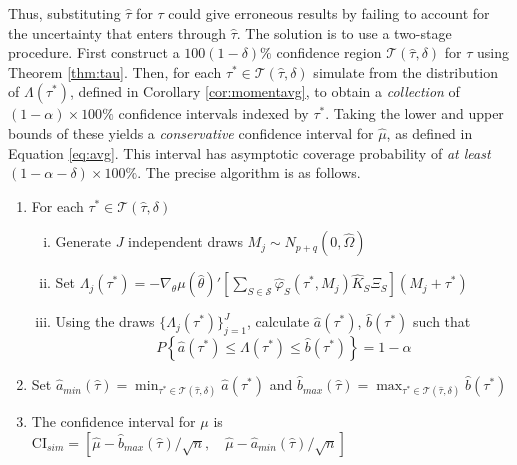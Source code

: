 Thus, substituting $\widehat{\tau}$ for $\tau$ could give erroneous results by failing to account for the uncertainty that enters through $\widehat{\tau}$. 
The solution is to use a two-stage procedure. 
First construct a  $100(1-\delta)\%$ confidence region $\mathscr{T}(\widehat{\tau},\delta)$ for $\tau$ using Theorem \ref{thm:tau}. 
Then, for each $\tau^* \in \mathscr{T}(\widehat{\tau},\delta)$ simulate from the distribution of $\Lambda(\tau^*)$, defined in Corollary \ref{cor:momentavg}, to obtain a \emph{collection} of $(1-\alpha)\times 100\%$ confidence intervals indexed by $\tau^*$. 
Taking the lower and upper bounds of these yields a \emph{conservative} confidence interval for $\widehat{\mu}$, as defined in Equation \ref{eq:avg}. 
This interval has asymptotic coverage probability of \emph{at least} $(1-\alpha-\delta)\times 100\%$.
The precise algorithm is as follows.
\begin{alg}
\label{alg:conf}
\mbox{}
\begin{enumerate}
	\item For each $\tau^* \in \mathscr{T}(\widehat{\tau},\delta)$ 
		\begin{enumerate}[(i)]
			\item Generate $J$ independent draws $M_j \sim N_{p+q}( 0, \widehat{\Omega} )$
			\item Set $\Lambda_j(\tau^*) = -\nabla_\theta\mu(\widehat{\theta})'\left[\sum_{S \in \mathscr{S}} \widehat{\varphi}_S(\tau^*,M_j) \widehat{K}_S\Xi_S\right] (M_j + \tau^*)$
			\item Using the draws $\{\Lambda_j(\tau^*)\}_{j=1}^J$, calculate $\widehat{a}(\tau^*)$, $\widehat{b}(\tau^*)$ such that
		$$P\left\{ \widehat{a}(\tau^*) \leq\Lambda(\tau^*)\leq \widehat{b}(\tau^*) \right\} = 1 - \alpha$$
		\end{enumerate}
	\item Set $\displaystyle \widehat{a}_{min}(\widehat{\tau})=\min_{\tau^* \in \mathscr{T}(\widehat{\tau},\delta)} \widehat{a}(\tau^*)$ and $\displaystyle \widehat{b}_{max}(\widehat{\tau})= \max_{\tau^* \in \mathscr{T}(\widehat{\tau},\delta)} \widehat{b}(\tau^*)$ \vspace{0.5em}
	\item The confidence interval for $\mu$ is
				$ \mbox{CI}_{sim}=\left[ \widehat{\mu} - \widehat{b}_{max}(\widehat{\tau})/\sqrt{n}, \quad \widehat{\mu} - \widehat{a}_{min}(\widehat{\tau})/\sqrt{n} \right]$
\end{enumerate}
\end{alg}

